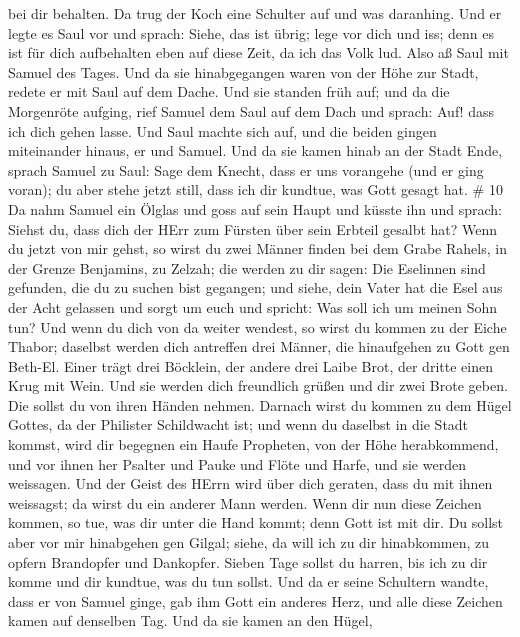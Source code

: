 bei dir behalten.  Da trug der Koch eine Schulter auf und
was daranhing. Und er legte es Saul vor und sprach: Siehe, das ist
übrig; lege vor dich und iss; denn es ist für dich aufbehalten eben auf
diese Zeit, da ich das Volk lud. Also aß Saul mit Samuel des Tages.
 Und da sie hinabgegangen waren von der Höhe zur Stadt,
redete er mit Saul auf dem Dache.  Und sie standen früh
auf; und da die Morgenröte aufging, rief Samuel dem Saul auf dem Dach
und sprach: Auf! dass ich dich gehen lasse. Und Saul machte sich auf,
und die beiden gingen miteinander hinaus, er und Samuel. 
Und da sie kamen hinab an der Stadt Ende, sprach Samuel zu Saul: Sage
dem Knecht, dass er uns vorangehe (und er ging voran); du aber stehe
jetzt still, dass ich dir kundtue, was Gott gesagt hat. \# 10
 Da nahm Samuel ein Ölglas und goss auf sein Haupt und
küsste ihn und sprach: Siehst du, dass dich der HErr zum Fürsten über
sein Erbteil gesalbt hat?  Wenn du jetzt von mir gehst, so
wirst du zwei Männer finden bei dem Grabe Rahels, in der Grenze
Benjamins, zu Zelzah; die werden zu dir sagen: Die Eselinnen sind
gefunden, die du zu suchen bist gegangen; und siehe, dein Vater hat die
Esel aus der Acht gelassen und sorgt um euch und spricht: Was soll ich
um meinen Sohn tun?  Und wenn du dich von da weiter wendest,
so wirst du kommen zu der Eiche Thabor; daselbst werden dich antreffen
drei Männer, die hinaufgehen zu Gott gen Beth-El. Einer trägt drei
Böcklein, der andere drei Laibe Brot, der dritte einen Krug mit Wein.
 Und sie werden dich freundlich grüßen und dir zwei Brote
geben. Die sollst du von ihren Händen nehmen.  Darnach wirst
du kommen zu dem Hügel Gottes, da der Philister Schildwacht ist; und
wenn du daselbst in die Stadt kommst, wird dir begegnen ein Haufe
Propheten, von der Höhe herabkommend, und vor ihnen her Psalter und
Pauke und Flöte und Harfe, und sie werden weissagen.  Und
der Geist des HErrn wird über dich geraten, dass du mit ihnen weissagst;
da wirst du ein anderer Mann werden.  Wenn dir nun diese
Zeichen kommen, so tue, was dir unter die Hand kommt; denn Gott ist mit
dir.  Du sollst aber vor mir hinabgehen gen Gilgal; siehe,
da will ich zu dir hinabkommen, zu opfern Brandopfer und Dankopfer.
Sieben Tage sollst du harren, bis ich zu dir komme und dir kundtue, was
du tun sollst.  Und da er seine Schultern wandte, dass er
von Samuel ginge, gab ihm Gott ein anderes Herz, und alle diese Zeichen
kamen auf denselben Tag.  Und da sie kamen an den Hügel,
